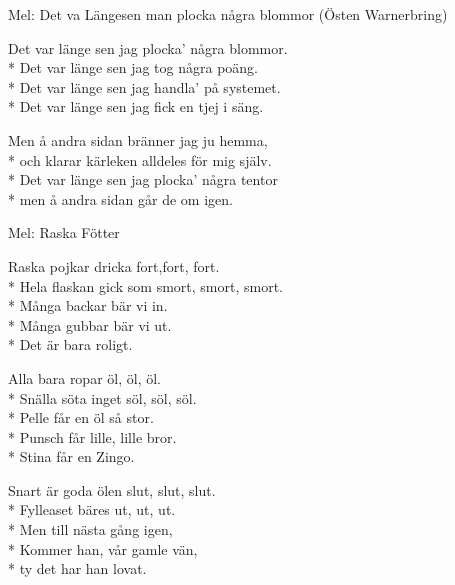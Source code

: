 \begin{SongText}
    \begin{SongInfo}
        Mel: Det va Längesen man plocka några blommor (Östen Warnerbring)
    \end{SongInfo}
    \begin{SongVerse}
        Det var länge sen jag plocka’ några blommor.\\*%
        Det var länge sen jag tog några poäng.\\*%
        Det var länge sen jag handla’ på systemet.\\*%
        Det var länge sen jag fick en tjej i säng.
    \end{SongVerse}
    \begin{SongVerse}
        Men å andra sidan bränner jag ju hemma,\\*%
        och klarar kärleken alldeles för mig själv.\\*%
        Det var länge sen jag plocka’ några tentor\\*%
        men å andra sidan går de om igen.
    \end{SongVerse}
\end{SongText}
\begin{SongText}[Sittningsvisa]
    \begin{SongInfo}
        Mel: Raska Fötter
    \end{SongInfo}
    \begin{SongVerse}
        Raska pojkar dricka fort,fort, fort.\\*%
        Hela flaskan gick som smort, smort, smort.\\*%
        Många backar bär vi in.\\*%
        Många gubbar bär vi ut.\\*%
        Det är bara roligt.
    \end{SongVerse}
    \begin{SongVerse}
        Alla bara ropar öl, öl, öl.\\*%
        Snälla söta inget söl, söl, söl.\\*%
        Pelle får en öl så stor.\\*%
        Punsch får lille, lille bror.\\*%
        Stina får en Zingo.
    \end{SongVerse}
    \begin{SongVerse}
        Snart är goda ölen slut, slut, slut.\\*%
        Fylleaset bäres ut, ut, ut.\\*%
        Men till nästa gång igen,\\*%
        Kommer han, vår gamle vän,\\*%
        ty det har han lovat.
    \end{SongVerse}
\end{SongText}
